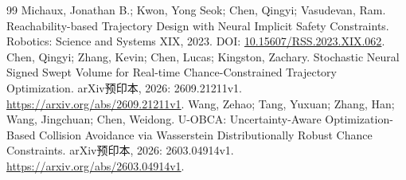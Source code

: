 \documentclass{aas}
\begin{document}
\begin{thebibliography}{99}
 Michaux, Jonathan B.; Kwon, Yong Seok; Chen, Qingyi; Vasudevan, Ram. Reachability-based Trajectory Design with Neural Implicit Safety Constraints. Robotics: Science and Systems XIX, 2023. DOI: \url{10.15607/RSS.2023.XIX.062}.
 Chen, Qingyi; Zhang, Kevin; Chen, Lucas; Kingston, Zachary. Stochastic Neural Signed Swept Volume for Real-time Chance-Constrained Trajectory Optimization. arXiv预印本, 2026: 2609.21211v1. \url{https://arxiv.org/abs/2609.21211v1}.
 Wang, Zehao; Tang, Yuxuan; Zhang, Han; Wang, Jingchuan; Chen, Weidong. U-OBCA: Uncertainty-Aware Optimization-Based Collision Avoidance via Wasserstein Distributionally Robust Chance Constraints. arXiv预印本, 2026: 2603.04914v1. \url{https://arxiv.org/abs/2603.04914v1}.
\end{thebibliography}
\end{document}
